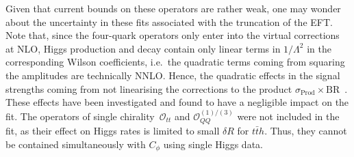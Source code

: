 	Given that current bounds on these operators are rather weak, one may wonder about the uncertainty in these fits associated with the truncation of the EFT.
	Note that, since the four-quark operators only enter into the virtual corrections at NLO, Higgs production and decay contain only linear terms in $1/\Lambda^{2}$ in the corresponding Wilson coefficients, i.e.~the quadratic terms coming from squaring the amplitudes are technically NNLO. 
	Hence, the quadratic effects in the signal strengths coming from not linearising the corrections to the product $\sigma_\mathrm{ Prod} \times \mathrm{ BR}$~\!.  These effects have been investigated and found to have a negligible impact on the fit. 
	The operators of single chirality~$\mathcal O_{tt}$ and $\mathcal{O}_{QQ}^{(1)/(3)}$ were not included in the fit, as their effect on Higgs rates is limited to small $\delta R$ for $t\bar t h$. Thus, they cannot be contained simultaneously with $C_\phi$ using single Higgs data.  
